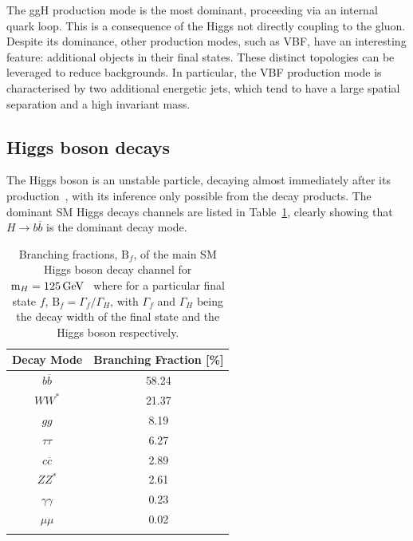 The ggH production mode is the most dominant, proceeding via an internal quark loop. This is a consequence of the Higgs not directly coupling to the gluon. Despite its dominance, other production modes, such as VBF, have an interesting feature: additional objects in their final states. These distinct topologies can be leveraged to reduce backgrounds. In particular, the VBF production mode is characterised by two additional energetic jets, which tend to have a large spatial separation and a high invariant mass.

\subsection{Higgs boson decays}

The Higgs boson is an unstable particle, decaying almost immediately after its production~\cite{MarkThompson}, with its inference only possible from the decay products. The dominant \ac{SM} Higgs decays channels are listed in Table~\ref{Table:Introduction_HiggsBranchingFractions}, clearly showing that $H\rightarrow b\overline{b}$ is the dominant decay mode. 

\begin{table}[h]
\centering
\renewcommand{\arraystretch}{1.5} %
\setlength{\tabcolsep}{12pt} %
\begin{tabular}{|c|c|}
\hline
Decay Mode                  & Branching Fraction {[}\%{]} \\ \hline \hline
$b\overline{b}$             & 58.24 \\ 
\arrayrulecolor{lightgray} \hline
$WW^*$                      & 21.37 \\ 
\arrayrulecolor{lightgray} \hline
$gg$                        & 8.19  \\ 
\arrayrulecolor{lightgray} \hline
$\tau\tau$                  & 6.27  \\ 
\arrayrulecolor{lightgray} \hline
$c\overline{c}$             & 2.89  \\ 
\arrayrulecolor{lightgray} \hline
$ZZ^*$                      & 2.61  \\ 
\arrayrulecolor{lightgray} \hline
$\gamma\gamma$              & 0.23  \\ 
\arrayrulecolor{lightgray} \hline
$\mu\mu$                    & 0.02  \\ 
\arrayrulecolor{black} \hline
\end{tabular}
\caption[Branching fractions of main Standard Model Higgs decay channels at $\text{m}_H = 125\GeV$]{Branching fractions, $\text{B}_f$, of the main \ac{SM} Higgs boson decay channel for $\text{m}_H = 125\GeV$~\cite{HiggsProduction_XS_13TeV,HiggsProduction_XS_13p6TeV} where for a particular final state $f$, $\text{B}_f = \Gamma_f/\Gamma_H$, with $\Gamma_f$ and $\Gamma_H$ being the decay width of the final state and the Higgs boson respectively.}
\label{Table:Introduction_HiggsBranchingFractions}
\end{table}

